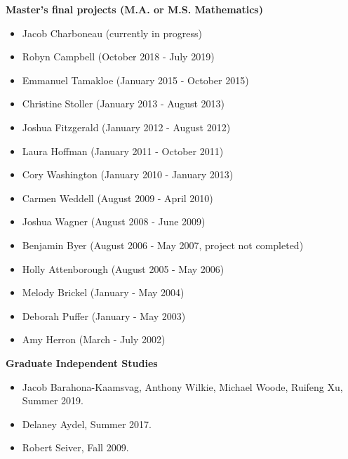 \documentclass[overlapped,line,letterpaper]{res}
\begin{document}
\begin{resume}
{\bf Master's final projects (M.A. or M.S. Mathematics)}  \\
\begin{itemize}
\item
Jacob Charboneau (currently in progress)

\item
Robyn Campbell (October 2018 - July 2019)

\item
Emmanuel Tamakloe (January 2015 - October 2015)

\item
Christine Stoller (January 2013 - August 2013)

\item
Joshua Fitzgerald (January 2012 - August 2012)

\item
Laura Hoffman (January 2011 - October 2011)

\item
Cory Washington (January 2010 - January 2013)

\item
Carmen Weddell (August 2009 - April 2010)

\item
Joshua Wagner (August 2008 - June 2009)

\item
Benjamin Byer (August 2006 - May 2007, project not completed)

\item
Holly Attenborough (August 2005 - May 2006)

\item
Melody Brickel (January - May 2004)

\item
Deborah Puffer (January - May 2003)

\item
Amy Herron (March - July 2002)


\end{itemize}

{\bf Graduate Independent Studies}

\begin{itemize}


\item
Jacob Barahona-Kaamsvag, Anthony Wilkie, Michael Woode, Ruifeng Xu, Summer 2019.

\item
Delaney Aydel, Summer 2017.

\item
Robert Seiver, Fall 2009.


\end{itemize}
\end{resume}
\end{document}
